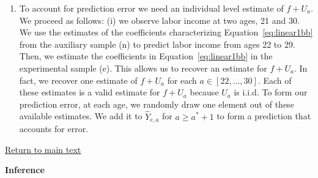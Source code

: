 \documentclass[static]{JJH-Beamer}
\begin{document}
\begin{frame}

\begin{enumerate}[5.]
\item To account for prediction error we need an individual level estimate of $f + U_{a}$. We proceed as follows: (i) we observe labor income at two ages, 21 and 30. We use the estimates of the coefficients characterizing Equation~\eqref{eq:linear1bb} from the auxiliary sample (n) to predict labor income from ages 22 to 29. Then, we estimate the coefficients in Equation~\eqref{eq:linear1bb} in the experimental sample (e). This allows us to recover an estimate for $f + U_{a}$. In fact, we recover one estimate of $f + U_{a}$ for each $a \in \left[22, \ldots, 30 \right]$. Each of these estimates is a valid estimate for $f + U_{a}$ because $U_{a}$ is i.i.d. To form our prediction error, at each age, we randomly draw one element out of these available estimates. We add it to  $\hat{Y}_{e,a}$ for $a \geq a^* + 1$ to form a prediction that accounts for error.
\end{enumerate}

\end{frame}

\begin{frame}

\begin{center}
\hyperlink{ret:cocopuffs}{\underline{Return to main text}}
\end{center}

\end{frame}

\clearpage
{}
\begin{frame}

\hypertarget{fruitypebbles}{}
\begin{center}
\textbf{Inference}\label{appendix:bootstrap}
\end{center}

\end{frame}
\end{document}
